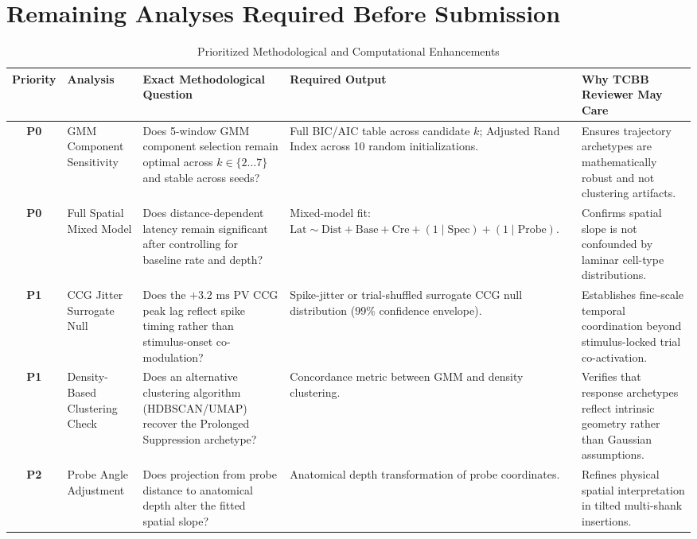 \documentclass[10pt,journal,compsoc]{IEEEtran}
\begin{document}
\section*{Remaining Analyses Required Before Submission}
\begin{table}[t]
\caption{Prioritized Methodological and Computational Enhancements}
\label{tab:remaining_analyses}
\centering
\footnotesize
\setlength{\tabcolsep}{5pt}
\begin{tabularx}{\textwidth}{cp{3.0cm}>{\raggedright\arraybackslash}X>{\raggedright\arraybackslash}Xp{4.2cm}}
\toprule
\textbf{Priority} & \textbf{Analysis} & \textbf{Exact Methodological Question} & \textbf{Required Output} & \textbf{Why TCBB Reviewer May Care} \\
\midrule
\textbf{P0} & GMM Component Sensitivity & Does 5-window GMM component selection remain optimal across $k \in \{2\dots 7\}$ and stable across seeds? & Full BIC/AIC table across candidate $k$; Adjusted Rand Index across 10 random initializations. & Ensures trajectory archetypes are mathematically robust and not clustering artifacts. \\
\addlinespace
\textbf{P0} & Full Spatial Mixed Model & Does distance-dependent latency remain significant after controlling for baseline rate and depth? & Mixed-model fit: $\text{Lat} \sim \text{Dist} + \text{Base} + \text{Cre} + (1\mid\text{Spec}) + (1\mid\text{Probe})$. & Confirms spatial slope is not confounded by laminar cell-type distributions. \\
\addlinespace
\textbf{P1} & CCG Jitter Surrogate Null & Does the $+3.2\text{ ms}$ PV CCG peak lag reflect spike timing rather than stimulus-onset co-modulation? & Spike-jitter or trial-shuffled surrogate CCG null distribution (99\% confidence envelope). & Establishes fine-scale temporal coordination beyond stimulus-locked trial co-activation. \\
\addlinespace
\textbf{P1} & Density-Based Clustering Check & Does an alternative clustering algorithm (HDBSCAN/UMAP) recover the Prolonged Suppression archetype? & Concordance metric between GMM and density clustering. & Verifies that response archetypes reflect intrinsic geometry rather than Gaussian assumptions. \\
\addlinespace
\textbf{P2} & Probe Angle Adjustment & Does projection from probe distance to anatomical depth alter the fitted spatial slope? & Anatomical depth transformation of probe coordinates. & Refines physical spatial interpretation in tilted multi-shank insertions. \\
\bottomrule
\end{tabularx}
\end{table}



\end{document}
